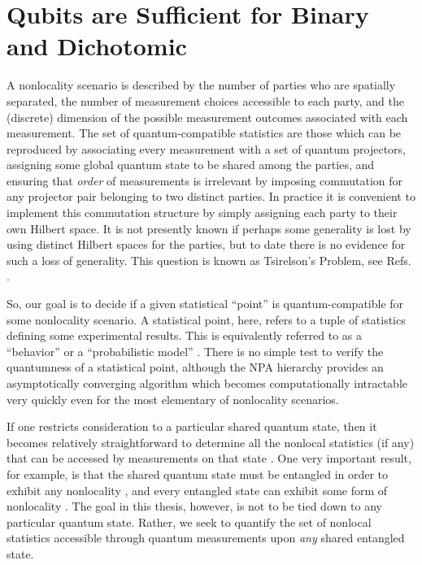 \documentclass[
  12pt          %
  ,letterpaper  %
  ,center       %
  ,noupper      %
  ,english,fleqn]{uconnthesis}
\let\stdsection\section
\renewcommand\section{\newpage\stdsection}
\begin{document}
\section{Qubits are Sufficient for Binary and Dichotomic}\label{sec:qubitssufficient}
    A nonlocality scenario is described by the number of parties who are spatially separated, the number of measurement choices accessible to each party, and the (discrete) dimension of the possible measurement outcomes associated with each measurement. The set of quantum-compatible statistics are those which can be reproduced by associating every measurement with a set of quantum projectors, assigning some global quantum state to be shared among the parties, and ensuring that {\em order} of measurements is irrelevant by imposing commutation for any projector pair belonging to two distinct parties. In practice it is convenient to implement this commutation structure by simply assigning each party to their own Hilbert space. It is not presently known if perhaps some generality is lost by using distinct Hilbert spaces for the parties, but to date there is no evidence for such a loss of generality. This question is known as Tsirelson's Problem, see Refs. \cite{TsirelsonProblemArXiv,ConnesEmbedding,PhysicalTsirelson,KirchbergConjecture}.
   
    So, our goal is to decide if a given statistical ``point'' is quantum-compatible for some nonlocality scenario. A statistical point, here, refers to a tuple of statistics defining some experimental results. This is equivalently referred to as a ``behavior'' \cite{NPA2008Long} or a ``probabilistic model'' \cite{FritzCombinatorialLong}.  There is no simple test to verify the quantumness of a statistical point, although the NPA hierarchy \cite{NPA2007Short,NPA2008Long,DohertyNPA,NPAReview,FritzCombinatorialLong} provides an asymptotically converging algorithm which becomes computationally intractable very quickly even for the most elementary of nonlocality scenarios. 
    
    If one restricts consideration to a particular shared quantum state, then it becomes relatively straightforward to determine all the nonlocal statistics (if any) that can be accessed by measurements on that state \cite{GivenQB.NQubit,GivenQB.Cabello,GivenQB.TwoQubit,GivenQB.arXiv}. One very important result, for example, is that the shared quantum state must be entangled in order to exhibit any nonlocality \cite{NonlocalityWithoutEntanglement,WernerWolfQB,NeedEntanglement,CryptoPRA,MultipartiteEntanglement}, and every entangled state can exhibit some form of nonlocality \cite{HiddenNonlocality,UnifiedCorrelations,PPTNonlocal,AllEntangledNonlocality,AllEntangledNonlocal,CloserConnections}. The goal in this thesis, however, is not to be tied down to any particular quantum state. Rather, we seek to quantify the set of nonlocal statistics accessible through quantum measurements upon {\em any} shared entangled state. 
    
\end{document}

